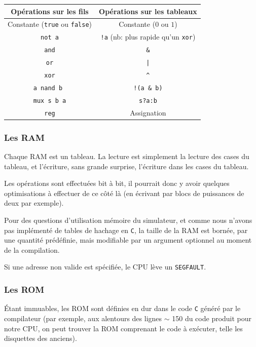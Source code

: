 \documentclass[10pt,a4paper,notitlepage ]{article}
\begin{document}
	\begin{center}
		
	\begin{tabular}{|c|c|}
		\hline
		Opérations sur les fils & Opérations sur les tableaux \\
		\hline
		Constante (\texttt{true} ou \texttt{false})& Constante ($0$ ou $1$)  \\
		\hline
		\texttt{not a}& \texttt{!a}  (nb: plus rapide qu'un \texttt{xor})\\
		\hline
		\texttt{and} & \texttt{\&}  \\
		\hline
		\texttt{or}& \texttt{|} \\
		\hline
		\texttt{xor}& \texttt{\^} \\
		\hline
		\texttt{a nand b }& \texttt{!(a \& b)} \\
		\hline
		\texttt{mux s b a}& \texttt{s?a:b} \\
		\hline
		\texttt{reg}&Assignation\\
		\hline
	\end{tabular}
	
	\end{center}

	\subsubsection{Les RAM}
	
	Chaque RAM est un tableau. La lecture est simplement la lecture des cases du tableau, et l'écriture, sans grande surprise, l'écriture dans les cases du tableau.
	
	Les opérations sont effectuées bit à bit, il pourrait donc y avoir quelques optimisations à effectuer de ce côté là (en écrivant par blocs de puissances de deux par exemple).
	
	Pour des questions d'utilisation mémoire du simulateur, et comme nous n'avons pas implémenté de tables de hachage en \texttt{C}, la taille de la RAM est bornée, par une quantité prédéfinie, mais modifiable par un argument optionnel au moment de la compilation.
	
	Si une adresse non valide est spécifiée, le CPU lève un \texttt{SEGFAULT}.
	
	\subsubsection{Les ROM}
	
	Étant immuables, les ROM sont définies en dur dans le code \texttt{C} généré par le compilateur (par exemple, aux alentours des lignes  $\sim$ 150 du code produit pour notre CPU, on peut trouver la ROM comprenant le code à exécuter, telle les disquettes des anciens).
	
\end{document}
